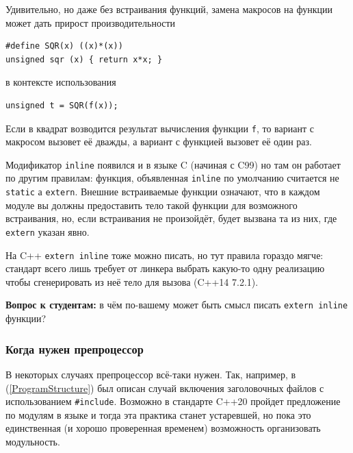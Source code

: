 \documentclass[a4paper,12pt,oneside]{article}
\newif\ifanswers
\begin{document}
Удивительно, но даже без встраивания функций, замена макросов на функции может дать прирост производительности

\begin{lstlisting}
#define SQR(x) ((x)*(x))
unsigned sqr (x) { return x*x; }
\end{lstlisting}

в контексте использования

\begin{lstlisting}
unsigned t = SQR(f(x));
\end{lstlisting}

Если в квадрат возводится результат вычисления функции \lstinline!f!, то вариант с макросом вызовет её дважды, а вариант с функцией вызовет её один раз.

Модификатор \lstinline!inline! появился и в языке C (начиная с C99) но там он работает по другим правилам: функция, объявленная \lstinline!inline! по умолчанию считается не \lstinline!static! а \lstinline!extern!. Внешние встраиваемые функции означают, что в каждом модуле вы должны предоставить тело такой функции для возможного встраивания, но, если встраивания не произойдёт, будет вызвана та из них, где \lstinline!extern! указан явно.

На C++ \lstinline!extern inline! тоже можно писать, но тут правила гораздо мягче: стандарт всего лишь требует от линкера выбрать какую-то одну реализацию чтобы сгенерировать из неё тело для вызова (C++14 7.2.1).

\textbf{Вопрос к студентам:} в чём по-вашему может быть смысл писать \lstinline!extern inline! функции?

\ifanswers
Возможный ответ: разница кроется в семантике статических переменных. Внутри \lstinline!static inline! функций создается столько их копий сколько функций, внутри \lstinline!extern inline! копия одна на всех.
\fi

\subsubsection{Когда нужен препроцессор}\label{subsub:preprocuses}

В некоторых случаях препроцессор всё-таки нужен. Так, например, в (\ref{ProgramStructure}) был описан случай включения заголовочных файлов с использованием \lstinline!#include!. Возможно в стандарте C++20 пройдет предложение по модулям в языке и тогда эта практика станет устаревшей, но пока это единственная (и хорошо проверенная временем) возможность организовать модульность.
\end{document}
